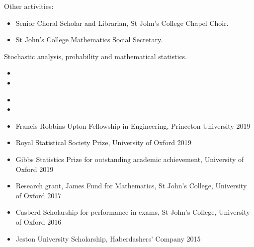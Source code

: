 \documentclass[
  date,
  number,
]{wgu-cv}
\begin{document}
Other activities:

\begin{itemize}
	\item Senior Choral Scholar and Librarian,
    St John's College Chapel Choir.
	\item St John's College Mathematics Social Secretary.
\end{itemize}



Stochastic analysis, probability and mathematical statistics.



\begin{itemize}
  \item {}
	\item {}
\end{itemize}

\begin{itemize}
  \item {}
  \item {}
\end{itemize}


\pagebreak



\begin{itemize}
  \item Francis Robbins Upton Fellowship in Engineering,
    Princeton University
    \hfill 2019%
  \item Royal Statistical Society Prize,
    University of Oxford
    \hfill 2019%
  \item Gibbs Statistics Prize for outstanding academic achievement,
    University of Oxford
    \hfill 2019%
	\item Research grant, James Fund for Mathematics,
    St John's College, University of Oxford
    \hfill 2017%
	\item Casberd Scholarship for performance in exams,
    St John's College, University of Oxford
    \hfill 2016%
  \item Jeston University Scholarship,
    Haberdashers' Company
    \hfill 2015%
\end{itemize}
\end{document}
